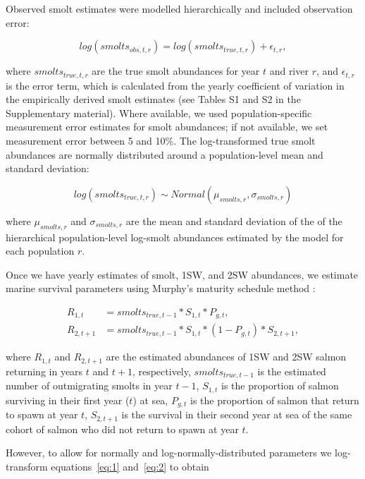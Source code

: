 \documentclass[12pt]{article}
\newcommand{\comment}[1]{\par {\bfseries \color{blue} #1 \par}} %
\begin{document}

Observed smolt estimates were modelled hierarchically and included
observation error:

\begin{equation}
log(smolts_{obs,t,r}) = log(smolts_{true,t,r}) + \epsilon_{t,r},
\end{equation}

where $smolts_{true,t,r}$ are the true smolt abundances for year $t$ and river
$r$, and $\epsilon_{t,r}$ is the error term, which is calculated from the yearly 
coefficient of variation in the empirically derived
smolt estimates (see Tables S1 and S2 in the Supplementary material). 
Where available, we used population-specific measurement error estimates for smolt abundances; if not 
available, we set measurement error between 5 and 10\%. 
The log-transformed true smolt abundances are
normally distributed around a population-level mean and standard deviation:

\begin{equation}
log(smolts_{true,t,r}) \sim Normal(\mu_{smolts,r}, \sigma_{smolts,r})
\end{equation}

where $\mu_{smolts,r}$ and $\sigma_{smolts,r}$ are the mean and standard
deviation of the of the hierarchical population-level log-smolt abundances
estimated by the model for each population $r$.

Once we have yearly estimates of smolt, 1SW, and 2SW abundances, we estimate
marine survival parameters using Murphy's maturity schedule method
\citep{Murphy1952, Ricker1975}:

\begin{align}
    R_{1,t} &= smolts_{true,t-1} * S_{1,t} * P_{g,t} \label{eq:1}, \\
    R_{2,t+1} &= smolts_{true,t-1} * S_{1,t} * (1 - P_{g,t}) * S_{2,t+1}, \label{eq:2}
\end{align}

where $R_{1,t}$ and $R_{2,t+1}$ are the estimated abundances of 1SW and 2SW
salmon returning in years $t$ and $t+1$, respectively, $smolts_{true,t-1}$ is the
estimated number of outmigrating smolts in year $t-1$, $S_{1,t}$ is the proportion of
salmon surviving in their first year ($t$) at sea, $P_{g,t}$ is the proportion of
salmon that return to spawn at year $t$, $S_{2,t+1}$ is the survival in their
second year at sea of the same cohort of salmon who did not return to spawn at
year $t$.

However, to allow for normally and log-normally-distributed parameters we
log-transform equations~\ref{eq:1} and~\ref{eq:2} to obtain
\end{document}

